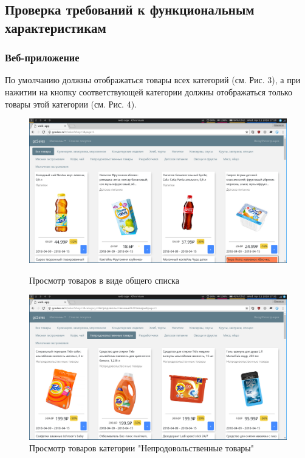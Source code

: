 \newpage
\subsection{Проверка требований к функциональным характеристикам}
\subsubsection{Веб-приложение}

По умолчанию должны отображаться товары всех категорий (см. Рис. 3), а при
нажитии на кнопку соответствующей категории должны отображаться только товары
этой категории (см. Рис. 4).

\begin{figure}[H]
    \centering
    \includegraphics[width=\textwidth]{./screenshots/interface_main.png}
    \caption{Просмотр товаров в виде общего списка}
    \endminipage\hfill
    \includegraphics[width=\textwidth]{./screenshots/categories.png}
    \caption{Просмотр товаров категории "Непродовольственные товары"}
    \endminipage
\end{figure}

